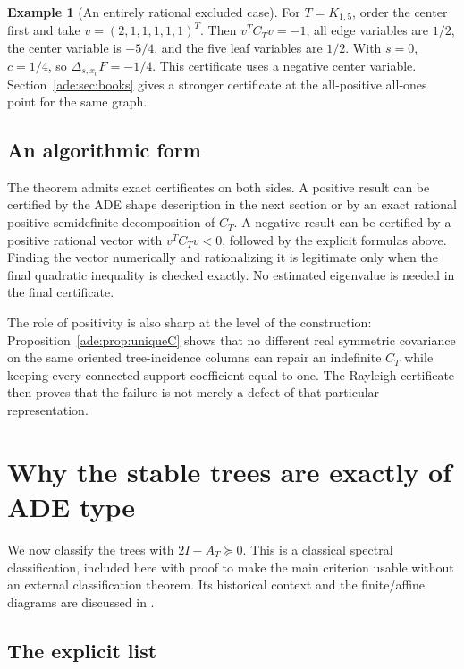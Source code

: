 \documentclass[11pt]{article}
\numberwithin{equation}{section}
\theoremstyle{definition}
\newtheorem{example}[theorem]{Example}%
\newcommand{\del}{\Delta}
\begin{document}
\begin{example}[An entirely rational excluded case]
For $T=K_{1,5}$, order the center first and take
$v=(2,1,1,1,1,1)^T$.  Then $v^TC_Tv=-1$, all edge variables are $1/2$,
the center variable is $-5/4$, and the five leaf variables are $1/2$.
With $s=0$, $c=1/4$, so
$\del_{s,x_0}F=-1/4$.
This certificate uses a negative center variable.  Section~\ref{ade:sec:books}
gives a stronger certificate at the all-positive all-ones point for the
same graph.
\end{example}

\subsection{An algorithmic form}

The theorem admits exact certificates on both sides.  A positive result
can be certified by the ADE shape description in the next section or by
an exact rational positive-semidefinite decomposition of $C_T$.
A negative result can be certified by a positive rational vector with
$v^TC_Tv<0$, followed by the explicit formulas above.  Finding the vector
numerically and rationalizing it is legitimate only when the final
quadratic inequality is checked exactly.  No estimated eigenvalue is
needed in the final certificate.

The role of positivity is also sharp at the level of the construction:
Proposition~\ref{ade:prop:uniqueC} shows that no different real symmetric
covariance on the same oriented tree-incidence columns can repair an
indefinite $C_T$ while keeping every connected-support coefficient equal
to one.  The Rayleigh certificate then proves that the failure is not
merely a defect of that particular representation.

\section{Why the stable trees are exactly of ADE type}
\label{ade:sec:ADE}

We now classify the trees with $2I-A_T\succeq0$.  This is a classical
spectral classification, included here with proof to make the main
criterion usable without an external classification theorem.  Its
historical context and the finite/affine diagrams are discussed in
\cite{McKeeSmyth}.

\subsection{The explicit list}
\end{document}
